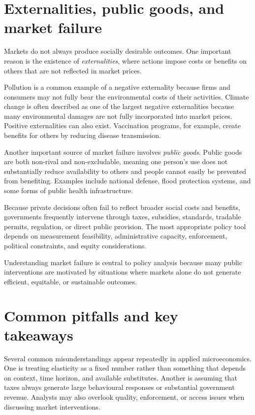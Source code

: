 \documentclass[
  11pt,
  oneside]{book}
\begin{document}
\section{Externalities, public goods, and market failure}\label{externalities-public-goods-and-market-failure}

Markets do not always produce socially desirable outcomes. One important reason is the existence of \emph{externalities}, where actions impose costs or benefits on others that are not reflected in market prices.

Pollution is a common example of a negative externality because firms and consumers may not fully bear the environmental costs of their activities. Climate change is often described as one of the largest negative externalities because many environmental damages are not fully incorporated into market prices. Positive externalities can also exist. Vaccination programs, for example, create benefits for others by reducing disease transmission.

Another important source of market failure involves \emph{public goods}. Public goods are both non-rival and non-excludable, meaning one person's use does not substantially reduce availability to others and people cannot easily be prevented from benefiting. Examples include national defense, flood protection systems, and some forms of public health infrastructure.

Because private decisions often fail to reflect broader social costs and benefits, governments frequently intervene through taxes, subsidies, standards, tradable permits, regulation, or direct public provision. The most appropriate policy tool depends on measurement feasibility, administrative capacity, enforcement, political constraints, and equity considerations.

Understanding market failure is central to policy analysis because many public interventions are motivated by situations where markets alone do not generate efficient, equitable, or sustainable outcomes.

\section{Common pitfalls and key takeaways}\label{common-pitfalls-and-key-takeaways}

Several common misunderstandings appear repeatedly in applied microeconomics. One is treating elasticity as a fixed number rather than something that depends on context, time horizon, and available substitutes. Another is assuming that taxes always generate large behavioural responses or substantial government revenue. Analysts may also overlook quality, enforcement, or access issues when discussing market interventions.
\end{document}
